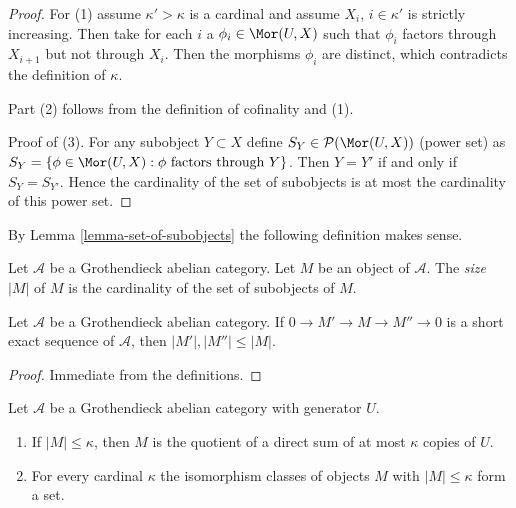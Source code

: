 \begin{proof}
For (1) assume $\kappa' > \kappa$ is a cardinal and assume
$X_i$, $i \in \kappa'$ is strictly increasing. Then take for
each $i$ a $\phi_i \in \Mor(U, X)$ such that $\phi_i$ factors through
$X_{i + 1}$ but not through $X_i$. Then the morphisms $\phi_i$
are distinct, which contradicts the definition of $\kappa$.

\medskip\noindent
Part (2) follows from the definition of cofinality and (1).

\medskip\noindent
Proof of (3). For any subobject $Y \subset X$
define $S_Y \in \mathcal{P}(\Mor(U, X))$ (power set) as
$S_Y = \{\phi \in \Mor(U,X) : \phi\text{ factors through }Y\}$.
Then $Y = Y'$ if and only if $S_Y = S_{Y'}$. Hence the cardinality
of the set of subobjects is at most the cardinality of this power set.
\end{proof}

\noindent
By Lemma \ref{lemma-set-of-subobjects} the following definition makes sense.

\begin{definition}
\label{definition-size}
Let $\mathcal{A}$ be a Grothendieck abelian category.
Let $M$ be an object of $\mathcal{A}$.
The {\it size} $|M|$ of $M$ is the cardinality of the set of subobjects
of $M$.
\end{definition}

\begin{lemma}
\label{lemma-size-goes-down}
Let $\mathcal{A}$ be a Grothendieck abelian category.
If $0 \to M' \to M \to M'' \to 0$ is a short exact sequence of
$\mathcal{A}$, then $|M'|, |M''| \leq |M|$.
\end{lemma}

\begin{proof}
Immediate from the definitions.
\end{proof}

\begin{lemma}
\label{lemma-set-iso-classes-bounded-size}
Let $\mathcal{A}$ be a Grothendieck abelian category with generator $U$.
\begin{enumerate}
\item If $|M| \leq \kappa$, then $M$ is the quotient of a direct
sum of at most $\kappa$ copies of $U$.
\item For every cardinal $\kappa$ the isomorphism classes
of objects $M$ with $|M| \leq \kappa$ form a set.
\end{enumerate}
\end{lemma}

